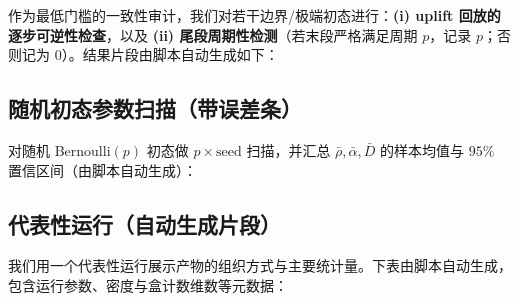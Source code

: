 作为最低门槛的一致性审计，我们对若干边界/极端初态进行：\textbf{(i) uplift 回放的逐步可逆性检查}，以及 \textbf{(ii) 尾段周期性检测}（若末段严格满足周期 $p$，记录 $p$；否则记为 $0$）。结果片段由脚本自动生成如下：



\subsection{随机初态参数扫描（带误差条）}

对随机 Bernoulli$(p)$ 初态做 $p\times \text{seed}$ 扫描，并汇总 $\bar\rho,\bar\alpha,\bar D$ 的样本均值与 $95\%$ 置信区间（由脚本自动生成）：



\subsection{代表性运行（自动生成片段）}

我们用一个代表性运行展示产物的组织方式与主要统计量。下表由脚本自动生成，包含运行参数、密度与盒计数维数等元数据：




